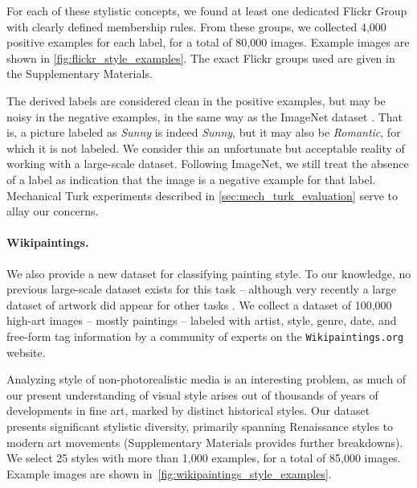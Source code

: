 For each of these stylistic concepts, we found at least one dedicated Flickr Group with clearly defined membership rules.
From these groups, we collected 4,000 positive examples for each label, for a total of 80,000 images.
Example images are shown in \autoref{fig:flickr_style_examples}.
The exact Flickr groups used are given in the Supplementary Materials.

The derived labels are considered clean in the positive examples, but may be noisy in the negative examples, in the same way as the ImageNet dataset \cite{Deng-CVPR-2009}.
That is, a picture labeled as \emph{Sunny} is indeed \emph{Sunny}, but it may also be \emph{Romantic}, for which it is not labeled.
We consider this an unfortunate but acceptable reality of working with a large-scale dataset.
Following ImageNet, we still treat the absence of a label as indication that the image is a negative example for that label.
Mechanical Turk experiments described in \autoref{sec:mech_turk_evaluation} serve to allay our concerns.

\paragraph{Wikipaintings.}
We also provide a new dataset for classifying painting style.
To our knowledge, no previous large-scale dataset exists for this task -- although very recently a large dataset of artwork did appear for other tasks \cite{Mensink2014}.
We collect a dataset of 100,000 high-art images -- mostly paintings -- labeled with artist, style, genre, date, and free-form tag information by a community of experts on the \texttt{Wikipaintings.org} website.

Analyzing style of non-photorealistic media is an interesting problem, as much of our present understanding of visual style arises out of thousands of years of developments in fine art, marked by distinct historical styles.
Our dataset presents significant stylistic diversity, primarily spanning Renaissance styles to modern art movements (Supplementary Materials provides further breakdowns).
We select 25 styles with more than 1,000 examples, for a total of 85,000 images.
Example images are shown in~\autoref{fig:wikipaintings_style_examples}.
